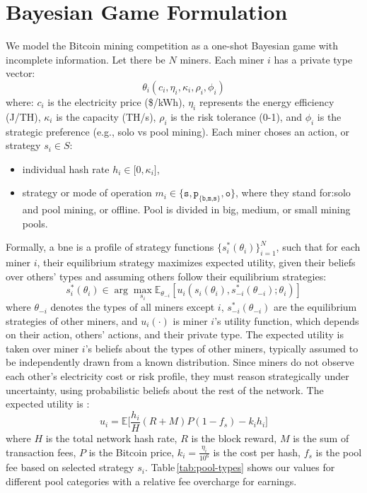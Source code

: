 \documentclass[12pt]{article}
\begin{document}

\section{Bayesian Game Formulation}
\label{sec:bayesian-game}
We model the Bitcoin mining competition as a one-shot Bayesian game with incomplete information. Let there be $N$ miners. Each miner $i$ has a private type vector:
\begin{equation}
	\theta_i(c_i, \eta_i, \kappa_i, \rho_i, \phi_i)
\end{equation}
where: $c_i$ is the electricity price (\$/kWh), $\eta_i$ represents the energy efficiency (J/TH), $\kappa_i$ is the capacity (TH/s), $\rho_i$ is the risk tolerance (0-1), and $\phi_i$ is the strategic preference (e.g., solo vs pool mining). Each miner choses an action, or strategy $s_i \in S$:
\begin{itemize}
	\item individual hash rate $h_i \in \big[ 0, \kappa_i\big]$,
	\item strategy or mode of operation $m_i \in \bigl\{  \texttt{s}, \texttt{p}_{\texttt{\{b,m,s\}}}, \texttt{o}\bigl\}$, where they stand for:solo and pool mining, or offline. Pool is divided in big, medium, or small mining pools.
\end{itemize}
Formally, a \gls{bne} is a profile of strategy functions $\bigl\{ s^*_i(\theta_i)\bigl\}_{i=1}^{N}$, such that for each miner $i$, their equilibrium strategy maximizes expected utility, given their beliefs over others' types and assuming others follow their equilibrium strategies:
\begin{equation}
	s_i^*(\theta_i) \in \arg\max_{s_i} \mathbb{E}_{\theta_{-i}} \left[ u_i(s_i(\theta_i), s_{-i}^*(\theta_{-i}); \theta_i) \right]
\end{equation}
where $\theta_{-i}$ denotes the types of all miners except $i$, $s^*_{-i}(\theta_{-i})$ are the equilibrium strategies of other miners, and $u_i(\cdot)$ is miner $i$'s utility function, which depends on their action, others' actions, and their private type. The expected utility is taken over miner $i$’s beliefs about the types of other miners, typically assumed to be independently drawn from a known distribution. Since miners do not observe each other’s electricity cost or risk profile, they must reason strategically under uncertainty, using probabilistic beliefs about the rest of the network. The expected utility is :
\begin{equation}
	u_i = \mathbb{E} \biggr[ \frac{h_i}{H} (R+M)P(1-f_s) - k_i h_i\biggr]
\end{equation}
where $H$ is the total network hash rate, $R$ is the block reward, $M$ is the sum of transaction fees, $P$ is the Bitcoin price, $k_i = \frac{\eta_i}{10^6}$ is the cost per hash, $f_s$ is the pool fee based on selected strategy $s_i$.
Table\,\ref{tab:pool-types} shows our values for different pool categories with a relative fee overcharge for earnings.
\end{document}
